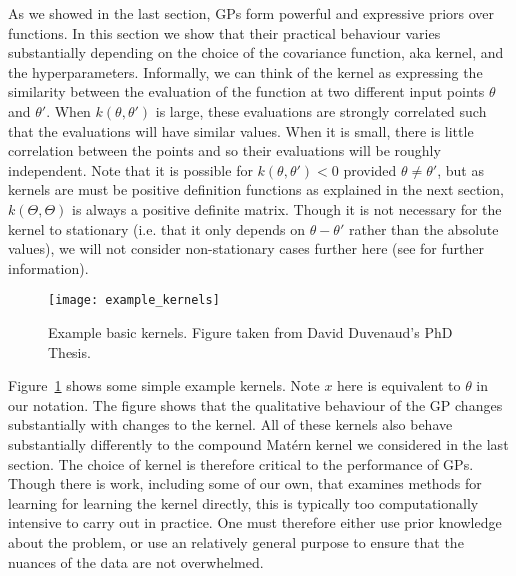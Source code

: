 As we showed in the last section, GPs form powerful and expressive priors over functions.
In this section we show that their practical behaviour varies substantially depending on the
choice of the covariance function, aka kernel, and the hyperparameters.   Informally, we can think
of the kernel as expressing the similarity between the evaluation of the function at two different input
points $\theta$ and $\theta'$.  When $k(\theta,\theta')$ is large, these evaluations are strongly
correlated such that the evaluations will have similar values.  When it is small, there is little
correlation between the points and so their evaluations will be roughly independent.  Note that
it is possible for $k(\theta,\theta')<0$ provided $\theta\neq\theta'$, but as kernels are must
be positive definition functions as explained in the next section, $k\left(\Theta,\Theta\right)$ is
always a positive definite matrix.  Though it is not necessary for the kernel to stationary (i.e.
that it only depends on $\theta-\theta'$ rather than the absolute values), we will not
consider non-stationary cases further here (see \cite{rasmussen2006gaussian} for further
information).

\begin{figure}[t]
	\centering
	\texttt{[image: example\_kernels]}
	\caption{Example basic kernels.  Figure taken from David Duvenaud's PhD
		Thesis. \label{fig:opt:example_kernels_duv}}
\end{figure}

Figure~\ref{fig:opt:example_kernels_duv}  shows
some simple example kernels.  Note $x$ here is equivalent to $\theta$ in our
notation.  The figure shows that the qualitative behaviour of the GP changes
substantially with changes to the kernel.  All of these kernels also behave
substantially differently to the compound Mat\'{e}rn kernel we considered in the last section.
The choice of kernel is therefore
critical to the performance of GPs.  Though there is work, including some of
our own, that examines methods for learning \cite{duvenaud2013structure,lloyd2014automatic,wilson2014fast,janz2016probstruct}
for learning the kernel directly, this is typically too computationally intensive
to carry out in practice.  One must therefore either use prior knowledge about the
problem, or use an relatively general purpose to ensure that the nuances of the
data are not overwhelmed.

